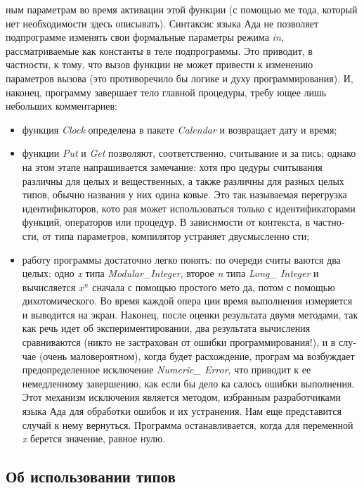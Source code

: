ным параметрам во время активации этой функции (с помощью ме­
тода, который нет необходимости здесь описывать). Синтаксис языка
Ада не позволяет подпрограмме изменять свои формальные параметры
режима {\it in}, рассматриваемые как константы в теле подпрограммы. Это
приводит, в частности, к тому, что вызов функции не может привести
к изменению параметров вызова (это противоречило бы логике и духу
программирования).
И, наконец, программу завершает тело главной процедуры, требу­
ющее лишь небольших комментариев:

\begin{itemize}
\item функция {\it Clock} определена в пакете {\it Calendar} и возвращает дату и
время;
\item функции {\it Put} и {\it Get} позволяют, соответственно, считывание и за­
пись; однако на этом этапе напрашивается замечание: хотя про­
цедуры считывания различны для целых и вещественных, а также
различны для разных целых типов, обычно названия у них одина­
ковые. Это так называемая перегрузка идентификаторов, кото­
рая может использоваться только с идентификаторами функций,
операторов или процедур. В зависимости от контекста, в частно­
сти, от типа параметров, компилятор устраняет двусмысленно­
сти;
\item работу программы достаточно легко понять: по очереди считы­
ваются два целых: одно {\it x} типа {\it Modular\_Integer}, второе {\it n} типа
{\it Long\_ Integer} и вычисляется {\it $x^n$} сначала с помощью простого мето­
да, потом с помощью дихотомического. Во время каждой опера­
ции время выполнения измеряется и выводится на экран. Наконец,
после оценки результата двумя методами, так как речь идет об
экспериментировании, два результата вычисления сравниваются
(никто не застрахован от ошибки программирования!), и в слу­
чае (очень маловероятном), когда будет расхождение, програм­
ма возбуждает предопределенное исключение {\it Numeric\_ Error}, что
приводит к ее немедленному завершению, как если бы дело ка­
салось ошибки выполнения. Этот механизм исключения является
методом, избранным разработчиками языка Ада для обработки
ошибок и их устранения. Нам еще представится случай к нему
вернуться. Программа останавливается, когда для переменной {\it x}
берется значение, равное нулю.
\end{itemize}
\newpage

\subsection{Об использовании типов}

